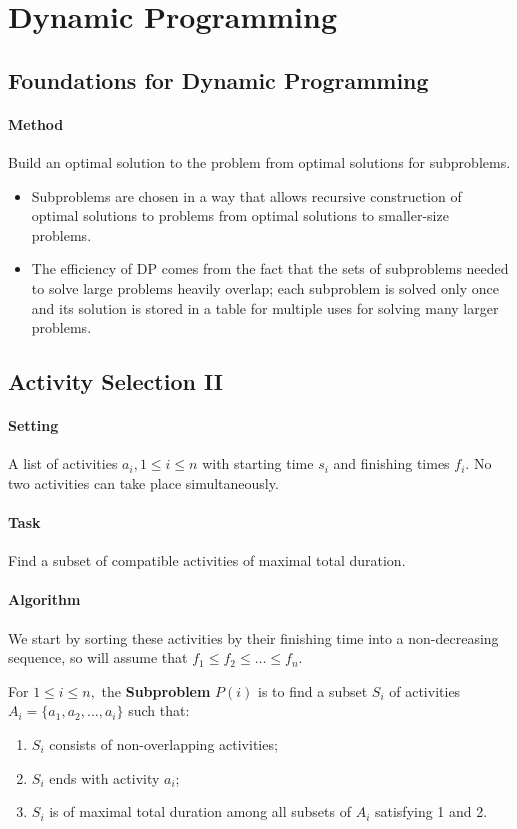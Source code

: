 
\section{Dynamic Programming}
\subsection{Foundations for Dynamic Programming}
\paragraph{Method}
Build an optimal solution to the problem from optimal solutions for subproblems.
\begin{itemize}
    \item Subproblems are chosen in a way that allows recursive construction of optimal solutions to problems from optimal solutions to smaller-size problems.
    \item The efficiency of DP comes from the fact that the sets of subproblems needed to solve large problems heavily overlap; each subproblem is solved only once and its solution is stored in a table for multiple uses for solving many larger problems.
\end{itemize}

\subsection{Activity Selection II}
\paragraph{Setting}
A list of activities \(a_i, 1 \leq i \leq n\) with starting time \(s_i\) and finishing times \(f_i\). No two activities can take place simultaneously. 
\paragraph{Task} 
Find a subset of compatible activities of maximal total duration. 

\paragraph{Algorithm}
We start by sorting these activities by their finishing time into a non-decreasing sequence, so will assume that \(f_1 \leq f_2 \leq \dots \leq f_n\).

For \(1 \leq i \leq n,\) the \textbf{Subproblem} \(P(i)\) is to find a subset \(S_i\) of activities \(A_i = \{a_1, a_2, \dots, a_i\}\) such that:
\begin{enumerate}
    \item \(S_i\) consists of non-overlapping activities;
    \item \(S_i\) ends with activity \(a_i\);
    \item \(S_i\) is of maximal total duration among all subsets of \(A_i\) satisfying 1 and 2.
\end{enumerate}

